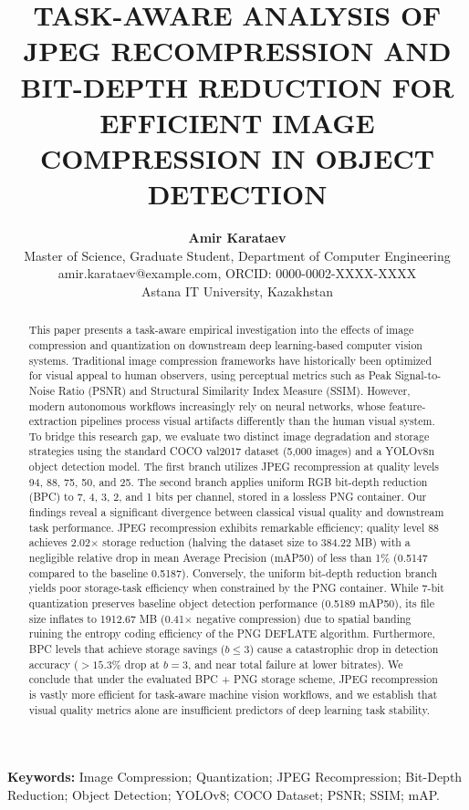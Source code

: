 \documentclass[12pt, a4paper]{article}
\title{TASK-AWARE ANALYSIS OF JPEG RECOMPRESSION AND BIT-DEPTH REDUCTION FOR EFFICIENT IMAGE COMPRESSION IN OBJECT DETECTION}
\author{
  \textbf{Amir Karataev} \\
  \small Master of Science, Graduate Student, Department of Computer Engineering \\
  \small amir.karataev@example.com, ORCID: 0000-0002-XXXX-XXXX \\
  \small Astana IT University, Kazakhstan
}
\date{}
\begin{document}
\maketitle

\begin{abstract}
This paper presents a task-aware empirical investigation into the effects of image compression and quantization on downstream deep learning-based computer vision systems. Traditional image compression frameworks have historically been optimized for visual appeal to human observers, using perceptual metrics such as Peak Signal-to-Noise Ratio (PSNR) and Structural Similarity Index Measure (SSIM). However, modern autonomous workflows increasingly rely on neural networks, whose feature-extraction pipelines process visual artifacts differently than the human visual system. To bridge this research gap, we evaluate two distinct image degradation and storage strategies using the standard COCO val2017 dataset (5,000 images) and a YOLOv8n object detection model. The first branch utilizes JPEG recompression at quality levels 94, 88, 75, 50, and 25. The second branch applies uniform RGB bit-depth reduction (BPC) to 7, 4, 3, 2, and 1 bits per channel, stored in a lossless PNG container. Our findings reveal a significant divergence between classical visual quality and downstream task performance. JPEG recompression exhibits remarkable efficiency; quality level 88 achieves 2.02$\times$ storage reduction (halving the dataset size to 384.22 MB) with a negligible relative drop in mean Average Precision (mAP50) of less than 1\% (0.5147 compared to the baseline 0.5187). Conversely, the uniform bit-depth reduction branch yields poor storage-task efficiency when constrained by the PNG container. While 7-bit quantization preserves baseline object detection performance (0.5189 mAP50), its file size inflates to 1912.67 MB (0.41$\times$ negative compression) due to spatial banding ruining the entropy coding efficiency of the PNG DEFLATE algorithm. Furthermore, BPC levels that achieve storage savings ($b \le 3$) cause a catastrophic drop in detection accuracy ($>15.3\%$ drop at $b=3$, and near total failure at lower bitrates). We conclude that under the evaluated BPC + PNG storage scheme, JPEG recompression is vastly more efficient for task-aware machine vision workflows, and we establish that visual quality metrics alone are insufficient predictors of deep learning task stability.
\end{abstract}

\noindent \textbf{Keywords:} Image Compression; Quantization; JPEG Recompression; Bit-Depth Reduction; Object Detection; YOLOv8; COCO Dataset; PSNR; SSIM; mAP.
\end{document}
